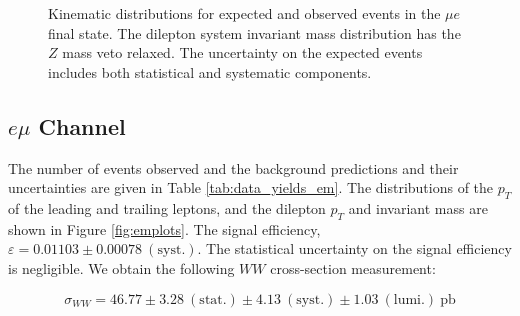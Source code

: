 \begin{figure}[!hbtp]
\begin{center}
\caption{Kinematic distributions for expected and observed events in the $\mu{e}$ final state.
The dilepton system invariant mass distribution has the $Z$ mass veto relaxed.
The uncertainty on the expected events includes both statistical and systematic components.}
\label{fig:meplots}
\end{center}
\end{figure}

%
%
%
\clearpage
\subsection{$e \mu$ Channel}

The number of events observed and the background predictions and their uncertainties are
given in Table \ref{tab:data_yields_em}.
The distributions of the $p_{T}$ of the leading and trailing leptons, and the dilepton $p_{T}$
and invariant mass are shown in Figure \ref{fig:emplots}.
The signal efficiency,  $\varepsilon = 0.01103 \pm 0.00078~\mathrm{(syst.)}$.
The statistical uncertainty on the signal efficiency is negligible.
We obtain the following $WW$ cross-section measurement:

\begin{equation*}
\sigma_{WW}  = 46.77 \pm 3.28~\mathrm{(stat.)} \pm 4.13~\mathrm{(syst.)} \pm 1.03~\mathrm{(lumi.)~pb} 
\end{equation*}

